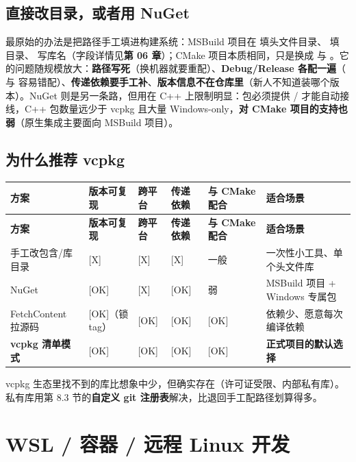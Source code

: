 \subsection{直接改目录，或者用 NuGet}
最原始的办法是把路径手工填进构建系统：MSBuild 项目在  填头文件目录、 填  目录、 写库名（字段详情见\textbf{第 06 章}）；CMake 项目本质相同，只是换成  与 。它的问题随规模放大：\textbf{路径写死}（换机器就要重配）、\textbf{Debug/Release 各配一遍}（ 与  容易错配）、\textbf{传递依赖要手工补}、\textbf{版本信息不在仓库里}（新人不知道装哪个版本）。NuGet 则是另一条路，但用在 C++ 上限制明显：包必须提供 / 才能自动接线，C++ 包数量远少于 vcpkg 且大量 Windows-only，\textbf{对 CMake 项目的支持也弱}（原生集成主要面向 MSBuild 项目）。

\subsection{为什么推荐 vcpkg}
\begin{longtable}{L{3.4cm}C{1.5cm}C{1.4cm}C{1.5cm}C{1.9cm}L{3.7cm}}
\toprule \textbf{方案} & \textbf{版本可复现} & \textbf{跨平台} & \textbf{传递依赖} & \textbf{与 CMake 配合} & \textbf{适合场景} \\ \midrule
\endfirsthead
\toprule \textbf{方案} & \textbf{版本可复现} & \textbf{跨平台} & \textbf{传递依赖} & \textbf{与 CMake 配合} & \textbf{适合场景} \\ \midrule
\endhead
\bottomrule \endlastfoot
手工改包含/库目录 & [X] & [X] & [X] & 一般 & 一次性小工具、单个头文件库 \\
NuGet & [OK] & [X] & [OK] & 弱 & MSBuild 项目 + Windows 专属包 \\
FetchContent 拉源码 & [OK]（锁 tag） & [OK] & [OK] & [OK] & 依赖少、愿意每次编译依赖 \\
\textbf{vcpkg 清单模式} & [OK] & [OK] & [OK] & [OK] & \textbf{正式项目的默认选择} \\
\end{longtable}
\begin{tipbox}[提示]
vcpkg 生态里找不到的库比想象中少，但确实存在（许可证受限、内部私有库）。私有库用第 8.3 节的\textbf{自定义 git 注册表}解决，比退回手工配路径划算得多。
\end{tipbox}

\section{WSL / 容器 / 远程 Linux 开发}
